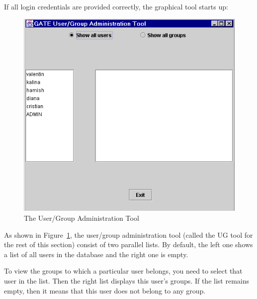 If all login credentials are provided correctly, the graphical tool
starts up:
%
\begin{figure}[htbp]
\begin{center}
\includegraphics[scale=0.5]{user-group-tool-gui.png}
\end{center}
\caption{The User/Group Administration Tool}
\label{fig:user_group_tool_gui}
\end{figure}
%


As shown in Figure~\ref{fig:user_group_tool_gui}, the user/group
administration tool (called the UG tool for the rest of this section)
consist of two parallel lists. By default, the left one shows a list of
all users in the database and the right one is empty.

To view the groups to which a particular user belongs, you need to
select that user in the list. Then the right list displays this user's
groups. If the list remains empty, then it means that this user does not
belong to any group.

